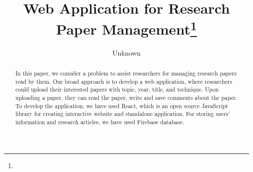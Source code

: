 \documentclass{article}
\title{Web Application for Research Paper Management\footnote{\protect}
}
\author{Unknown}
\begin{document}
\maketitle

\begin{abstract}
In this paper, we consider a problem to assist researchers for managing research papers read by them. Our broad approach is to develop a web application, where researchers could upload their interested papers with topic, year, title, and technique. Upon uploading a paper, they can read the paper,  write and save comments about the paper. To develop the application, we have used React, which is an open source JavaScript library for creating interactive website and standalone application. For storing users' information and research articles, we have used Firebase database.
\end{abstract}


\newpage






\medskip

\printbibliography
\end{document}
